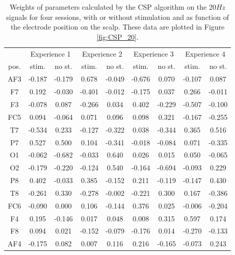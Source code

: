 \documentclass[smallextended]{svjour3}
\begin{document}
\begin{table}[]
\centering
\label{my-label}
\begin{tabular}{c|c|c|c|c|c|c|c|c|}
&\multicolumn{2}{c|}{Experience 1}&\multicolumn{2}{c|}{Experience 2}&\multicolumn{2}{c|}{Experience 3}&\multicolumn{2}{c|}{Experience 4}\\
pos.&stim.&no st.&stim.&no st.&stim.&no st.&stim.&no st.\\
\hline
AF3&-0.187&-0.179&0.678&-0.049&-0.676&0.070&-0.107&0.087\\
F7&0.192&-0.030&-0.401&-0.012&-0.175&0.037&0.266&-0.011\\
F3&-0.078&0.087&-0.266&0.034&0.402&-0.229&-0.507&-0.100\\
FC5&0.094&-0.064&0.071&0.096&0.098&0.321&-0.167&-0.255\\
T7&-0.534&0.233&-0.127&-0.322&0.038&-0.344&0.365&0.516\\
P7&0.527&0.500&0.104&-0.341&-0.018&-0.084&0.071&-0.335\\
O1&-0.062&-0.682&-0.033&0.640&0.026&0.015&0.050&-0.065\\
\hline
O2&-0.179&-0.220&-0.124&0.540&-0.164&-0.694&-0.093&0.229\\
P8&0.402&-0.033&0.385&-0.152&0.211&-0.119&-0.147&0.430\\
T8&-0.261&0.330&-0.278&-0.002&-0.221&0.300&0.167&-0.386\\
FC6&-0.090&0.000&0.106&-0.144&0.376&0.025&-0.006&-0.204\\
F4&0.195&-0.146&0.017&0.048&0.008&0.315&0.597&0.174\\
F8&0.094&0.021&-0.152&-0.079&-0.176&0.014&-0.270&-0.133\\
AF4&-0.175&0.082&0.007&0.116&0.216&-0.165&-0.073&0.243\\ 
\hline
\end{tabular}\label{table:CSP_20}
\caption{Weights of parameters calculated by the CSP algorithm on the 20$Hz$ signals for four sessions, with or without stimulation and as function of the electrode position on the scalp. These data are plotted in Figure \ref{fig:CSP_20}.}
\end{table} 
\end{document}
